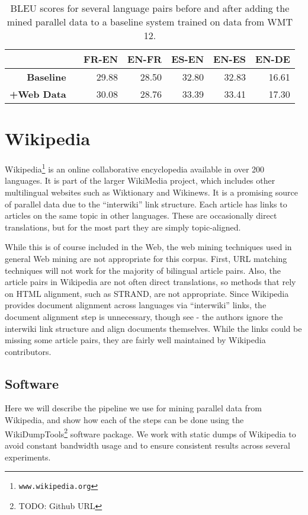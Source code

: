 \begin{table}[ht]
\begin{center}
\begin{tabular}{|r||r|r|r|r|r|}
\hline
& \textbf{FR-EN} & \textbf{EN-FR} & \textbf{ES-EN} & \textbf{EN-ES} & \textbf{EN-DE}\\
\hline
\textbf{Baseline} \
      & 29.88 & 28.50 & 32.80 & 32.83 & 16.61  \\
\hline
\textbf{+Web Data} \
      & 30.08 & 28.76 & 33.39 & 33.41 & 17.30  \\
\hline
\end{tabular}
\end{center}
\caption{BLEU scores for several language pairs before and after adding the mined
parallel data to a baseline system trained on data from WMT 12.}
\label{tab:cc_mt}
\end{table}

\section{Wikipedia}
Wikipedia\footnote{{\tt www.wikipedia.org}} is an online collaborative
encyclopedia available in over 200 languages. It is part of the larger WikiMedia
project, which includes other multilingual websites such as Wiktionary and
Wikinews. It is a promising source of parallel data due to the ``interwiki''
link structure. Each article has links to articles on the same topic in other
languages. These are occasionally direct translations, but for the most part
they are simply topic-aligned.

While this is of course included in the Web, the web mining techniques used in
general Web mining are not appropriate for this corpus. First, URL matching
techniques will not work for the majority of bilingual article pairs. Also, the
article pairs in Wikipedia are not often direct translations, so methods that
rely on HTML alignment, such as STRAND, are not appropriate. 
Since Wikipedia provides document alignment across languages via ``interwiki''
links, the document alignment step is unnecessary, though see \citet{Ture12} - the
authors ignore the interwiki link structure and align documents themselves.
While the links could be missing some article pairs, they are fairly well
maintained by Wikipedia contributors. \NoteJS{I should compare with his data if
possible.}

\subsection{Software}
Here we will describe the pipeline we use for mining parallel data from
Wikipedia, and show how each of the steps can be done using the
WikiDumpTools\footnote{TODO: Github URL} software package. We work with static
dumps of Wikipedia to avoid constant bandwidth usage and to ensure consistent
results across several experiments.

